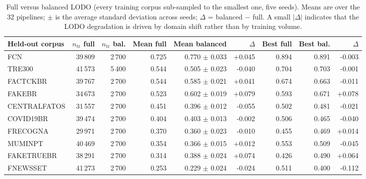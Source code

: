 \begin{table}[t]
\centering
\small
\caption{Full versus balanced LODO (every training corpus sub-sampled to the smallest one, five seeds). Means are over the 32 pipelines; $\pm$ is the average standard deviation across seeds; $\Delta$ = balanced $-$ full. A small $|\Delta|$ indicates that the LODO degradation is driven by domain shift rather than by training volume.}
\label{tab:lodo-balanced}
\begin{tabular}{lrrrrrrrr}
\toprule
Held-out corpus & $n_{\text{tr}}$ full & $n_{\text{tr}}$ bal. & Mean full & Mean balanced & $\Delta$ & Best full & Best bal. & $\Delta$ \\
\midrule
FCN & 39\,809 & 2\,700 & 0.725 & 0.770 $\pm$ 0.033 & +0.045 & 0.894 & 0.891 & -0.003 \\
TRE300 & 41\,573 & 5\,400 & 0.544 & 0.505 $\pm$ 0.023 & -0.040 & 0.704 & 0.703 & -0.001 \\
FACTCKBR & 39\,767 & 2\,700 & 0.544 & 0.585 $\pm$ 0.021 & +0.041 & 0.674 & 0.663 & -0.011 \\
FAKEBR & 34\,673 & 2\,700 & 0.523 & 0.602 $\pm$ 0.019 & +0.079 & 0.593 & 0.671 & +0.078 \\
CENTRALFATOS & 31\,557 & 2\,700 & 0.451 & 0.396 $\pm$ 0.012 & -0.055 & 0.502 & 0.481 & -0.021 \\
COVID19BR & 39\,474 & 2\,700 & 0.404 & 0.403 $\pm$ 0.013 & -0.002 & 0.506 & 0.465 & -0.040 \\
FRECOGNA & 29\,971 & 2\,700 & 0.370 & 0.360 $\pm$ 0.023 & -0.010 & 0.455 & 0.469 & +0.014 \\
MUMINPT & 40\,469 & 2\,700 & 0.354 & 0.366 $\pm$ 0.015 & +0.012 & 0.553 & 0.509 & -0.045 \\
FAKETRUEBR & 38\,291 & 2\,700 & 0.314 & 0.388 $\pm$ 0.024 & +0.074 & 0.426 & 0.490 & +0.064 \\
FNEWSSET & 41\,273 & 2\,700 & 0.253 & 0.229 $\pm$ 0.024 & -0.024 & 0.511 & 0.400 & -0.112 \\
\bottomrule
\end{tabular}
\end{table}
